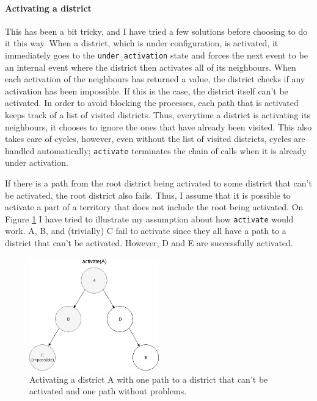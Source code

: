 \paragraph{Activating a district} This has been a bit tricky, and I have tried a few solutions before choosing to do it this way. When a district, which is under configuration, is activated, it immediately goes to the \texttt{under\_activation} state and forces the next event to be an internal event where the district then activates all of its neighbours. When each activation of the neighbours has returned a value, the district checks if any activation has been impossible. If this is the case, the district itself can't be activated. In order to avoid blocking the processes, each path that is activated keeps track of a list of visited districts. Thus, everytime a district is activating its neighbours, it chooses to ignore the ones that have already been visited. This also takes care of cycles, however, even without the list of visited districts, cycles are handled automatically; \texttt{activate} terminates the chain of calls when it is already under activation.

If there is a path from the root district being activated to some district that can't be activated, the root district also fails. Thus, I assume that it is possible to activate a part of a territory that does not include the root being activated. On Figure \ref{fig:activate} I have tried to illustrate my assumption about how \texttt{activate} would work. A, B, and (trivially) C fail to activate since they all have a path to a district that can't be activated. However, D and E are successfully activated.
\begin{figure}
  \centering
  \includegraphics[width=0.5\textwidth]{figures/activate}
  \caption{Activating a district A with one path to a district that can't be activated and one path without problems.}\label{fig:activate}
\end{figure}

